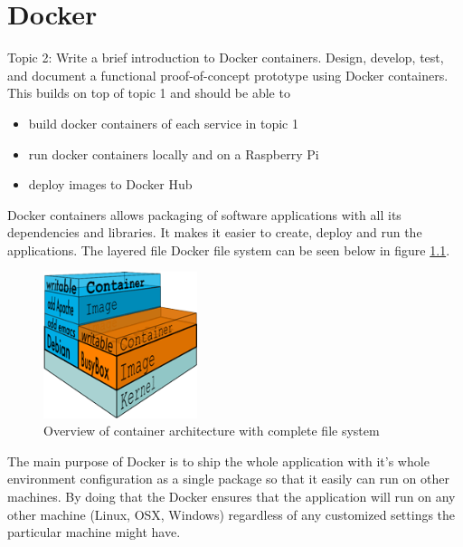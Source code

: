 \chapter{Docker}\label{ch:docker}
Topic 2: Write a brief introduction to Docker containers.  Design, develop, test, and document a functional proof-of-concept prototype using Docker containers. This builds on top of topic 1 and should be able to

\begin{itemize}
\item build docker containers of each service in topic 1
\item run docker containers locally and on a Raspberry Pi
\item deploy images to Docker Hub
\end{itemize}


Docker containers allows packaging of software applications with all its dependencies and libraries. It makes it easier to create, deploy and run the applications. The layered file Docker file system can be seen below in figure \ref{fig:filesystem}.

\begin{figure}[bth]
  \centering

      \includegraphics[width=0.4\textwidth]{gfx/what_is_layered_filesystems_sm}
  \caption{Overview of container architecture with complete file system }
  \label{fig:filesystem}
  
\end{figure}




The main purpose of Docker is to ship the whole application with it's whole environment configuration as a single package so that it easily can run on other machines. 
By doing that the Docker ensures that the application will run on any other machine (Linux, OSX, Windows) regardless of any customized settings the particular machine might have.



